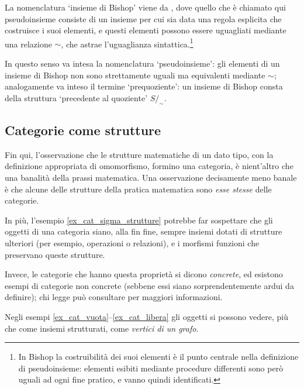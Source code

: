 \begin{remark}
	La nomenclatura `insieme di Bishop' viene da \cite{Bishop1985}, dove quello che è chiamato qui pseudoinsieme consiste di un insieme per cui sia data una regola esplicita che costruisce i suoi elementi, e questi elementi possono essere uguagliati mediante una relazione \(\sim\), che astrae l'uguaglianza sintattica.\footnote{In Bishop la costruibilità dei suoi elementi è il punto centrale nella definizione di pseudoinsieme: elementi esibiti mediante procedure differenti sono però uguali ad ogni fine pratico, e vanno quindi identificati.}

	In questo senso va intesa la nomenclatura `pseudoinsieme': gli elementi di un insieme di Bishop non sono strettamente uguali ma equivalenti mediante \(\sim\); analogamente va inteso il termine `prequoziente': un insieme di Bishop consta della struttura `precedente al quoziente' \(S/_\sim\).
\end{remark}
\subsection{Categorie come strutture}\label{ssec:categorie_strutture}
Fin qui, l'osservazione che le strutture matematiche di un dato tipo, con la definizione appropriata di omomorfismo, formino una categoria, è nient'altro che una banalità della prassi matematica. Una osservazione decisamente meno banale è che alcune delle strutture della pratica matematica sono \emph{esse stesse} delle categorie.

In più, l'esempio \ref{ex_cat_sigma_strutture} potrebbe far sospettare che gli oggetti di una categoria siano, alla fin fine, sempre insiemi dotati di strutture ulteriori (per esempio, operazioni o relazioni), e i morfismi funzioni che preservano queste strutture.

Invece, le categorie che hanno questa proprietà si dicono \emph{concrete}, ed esistono esempi di categorie non concrete (sebbene essi siano sorprendentemente ardui da definire); chi legge può consultare \cite{Freyd1973,Kuera1971} per maggiori informazioni.

Negli esempi \ref{ex_cat_vuota}--\ref{ex_cat_libera} gli oggetti si possono vedere, più che come insiemi strutturati, come \emph{vertici di un grafo}.

